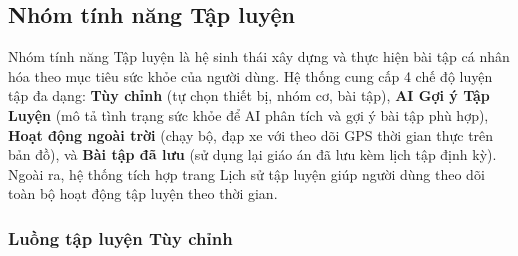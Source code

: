 \subsection{Nhóm tính năng Tập luyện}
\label{subsec:impl_training}

Nhóm tính năng Tập luyện là hệ sinh thái xây dựng và thực hiện bài tập cá nhân hóa theo mục tiêu sức khỏe của người dùng. Hệ thống cung cấp 4 chế độ luyện tập đa dạng: \textbf{Tùy chỉnh} (tự chọn thiết bị, nhóm cơ, bài tập), \textbf{AI Gợi ý Tập Luyện} (mô tả tình trạng sức khỏe để AI phân tích và gợi ý bài tập phù hợp), \textbf{Hoạt động ngoài trời} (chạy bộ, đạp xe với theo dõi GPS thời gian thực trên bản đồ), và \textbf{Bài tập đã lưu} (sử dụng lại giáo án đã lưu kèm lịch tập định kỳ). Ngoài ra, hệ thống tích hợp trang Lịch sử tập luyện giúp người dùng theo dõi toàn bộ hoạt động tập luyện theo thời gian.

\subsubsection{Luồng tập luyện Tùy chỉnh}

